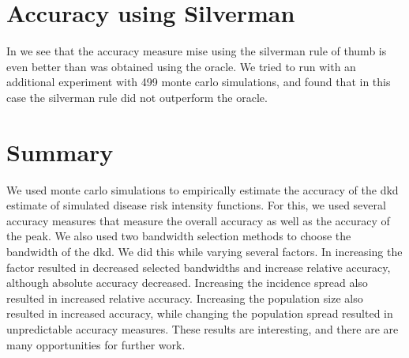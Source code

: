 \section{Accuracy using Silverman}

In  we see that the accuracy measure \gls{mise} using the \gls{silverman} rule of thumb is even better than was obtained using the \gls{oracle}.
We tried to run with an additional experiment with 499 monte carlo simulations, and found that in this case the \gls{silverman} rule did not outperform the \gls{oracle}.

\section{Summary}

We used monte carlo simulations to empirically estimate the accuracy of the \acrlong{dkd} estimate of simulated disease risk intensity functions.
For this, we used several accuracy measures that measure the overall accuracy as well as the accuracy of the peak.
We also used two bandwidth selection methods to choose the bandwidth of the \gls{dkd}.
We did this while varying several factors.
In  increasing the \gls{factor} resulted in decreased selected bandwidths
and increase relative accuracy, although absolute accuracy decreased.
Increasing the incidence \gls{spread} also resulted in increased relative accuracy.
Increasing the population size also resulted in increased accuracy,
while changing the population \gls{spread} resulted in unpredictable accuracy measures.
These results are interesting,
and there are are many opportunities for further work.


